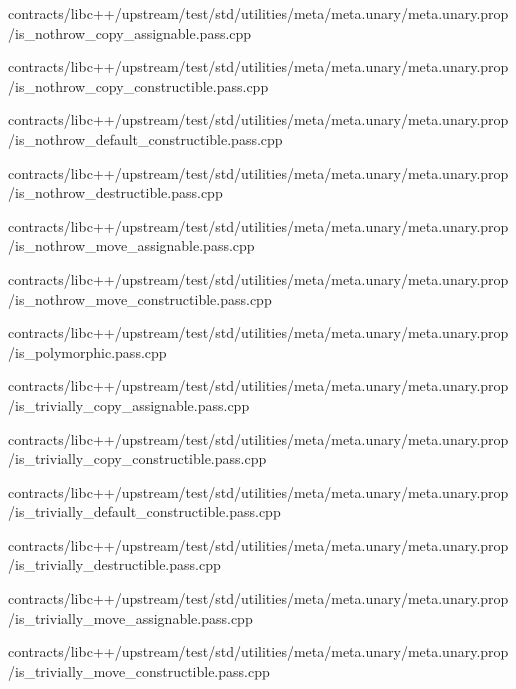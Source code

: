 \begin{DoxyCompactItemize}
contracts/libc++/upstream/test/std/utilities/meta/meta.\+unary/meta.\+unary.\+prop/is\+\_\+nothrow\+\_\+copy\+\_\+assignable.\+pass.\+cpp\item 
contracts/libc++/upstream/test/std/utilities/meta/meta.\+unary/meta.\+unary.\+prop/is\+\_\+nothrow\+\_\+copy\+\_\+constructible.\+pass.\+cpp\item 
contracts/libc++/upstream/test/std/utilities/meta/meta.\+unary/meta.\+unary.\+prop/is\+\_\+nothrow\+\_\+default\+\_\+constructible.\+pass.\+cpp\item 
contracts/libc++/upstream/test/std/utilities/meta/meta.\+unary/meta.\+unary.\+prop/is\+\_\+nothrow\+\_\+destructible.\+pass.\+cpp\item 
contracts/libc++/upstream/test/std/utilities/meta/meta.\+unary/meta.\+unary.\+prop/is\+\_\+nothrow\+\_\+move\+\_\+assignable.\+pass.\+cpp\item 
contracts/libc++/upstream/test/std/utilities/meta/meta.\+unary/meta.\+unary.\+prop/is\+\_\+nothrow\+\_\+move\+\_\+constructible.\+pass.\+cpp\item 
contracts/libc++/upstream/test/std/utilities/meta/meta.\+unary/meta.\+unary.\+prop/is\+\_\+polymorphic.\+pass.\+cpp\item 
contracts/libc++/upstream/test/std/utilities/meta/meta.\+unary/meta.\+unary.\+prop/is\+\_\+trivially\+\_\+copy\+\_\+assignable.\+pass.\+cpp\item 
contracts/libc++/upstream/test/std/utilities/meta/meta.\+unary/meta.\+unary.\+prop/is\+\_\+trivially\+\_\+copy\+\_\+constructible.\+pass.\+cpp\item 
contracts/libc++/upstream/test/std/utilities/meta/meta.\+unary/meta.\+unary.\+prop/is\+\_\+trivially\+\_\+default\+\_\+constructible.\+pass.\+cpp\item 
contracts/libc++/upstream/test/std/utilities/meta/meta.\+unary/meta.\+unary.\+prop/is\+\_\+trivially\+\_\+destructible.\+pass.\+cpp\item 
contracts/libc++/upstream/test/std/utilities/meta/meta.\+unary/meta.\+unary.\+prop/is\+\_\+trivially\+\_\+move\+\_\+assignable.\+pass.\+cpp\item 
contracts/libc++/upstream/test/std/utilities/meta/meta.\+unary/meta.\+unary.\+prop/is\+\_\+trivially\+\_\+move\+\_\+constructible.\+pass.\+cpp\end{DoxyCompactItemize}
